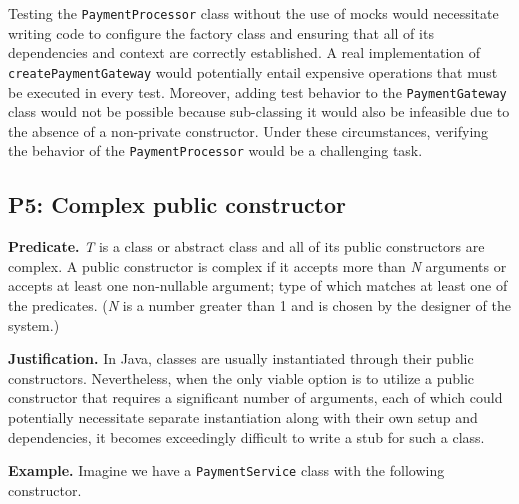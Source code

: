 \documentclass[conference]{IEEEtran}
\begin{document}
Testing the \texttt{PaymentProcessor} class without the use of mocks would necessitate writing code to configure the factory class and ensuring that all of its dependencies and context are correctly established. A real implementation of \texttt{createPaymentGateway} would potentially entail expensive operations that must be executed in every test. Moreover, adding test behavior to the \texttt{PaymentGateway} class would not be possible because sub-classing it would also be infeasible due to the absence of a non-private constructor. Under these circumstances, verifying the behavior of the \texttt{PaymentProcessor} would be a challenging task.


\subsection{P5: Complex public constructor}
\textbf{Predicate. }
\textit{T} is a class or abstract class and all of its public constructors are complex. A public constructor is complex if it accepts more than \textit{N} arguments or accepts at least one non-nullable argument; type of which matches at least one of the predicates. (\textit{N} is a number greater than 1 and is chosen by the designer of the system.)

\textbf{Justification. }
In Java, classes are usually instantiated through their public constructors. Nevertheless, when the only viable option is to utilize a public constructor that requires a significant number of arguments, each of which could potentially necessitate separate instantiation along with their own setup and dependencies, it becomes exceedingly difficult to write a stub for such a class.

\textbf{Example. }
Imagine we have a \texttt{PaymentService} class with the following constructor.
\end{document}
